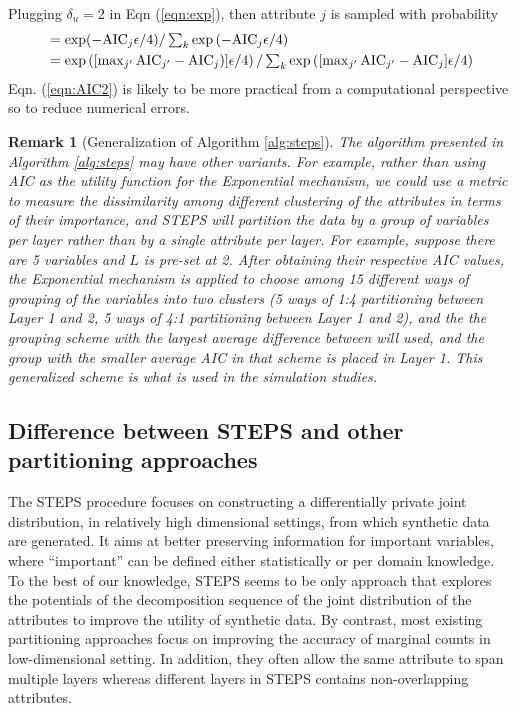 \documentclass[12pt, A4]{article}
\theoremstyle{plain}
\theoremstyle{exampstyle}\newtheorem{defn}{Definition}
\theoremstyle{exampstyle}\newtheorem{lem}{Lemma}
\theoremstyle{exampstyle}\newtheorem{cor}{Corollary}
\theoremstyle{exampstyle}\newtheorem{pro}{Proposition}
\theoremstyle{exampstyle}\newtheorem{cla}{Claim}
\theoremstyle{exampstyle}\newtheorem{rem}{Remark}
\begin{document}
Plugging $\delta_u =2 $ in Eqn (\ref{eqn:exp}), then attribute $j$ is sampled with probability
\begin{align}
&\textstyle= \exp(-\mbox{AIC}_j\epsilon/4)/\sum_k\exp\left(-\mbox{AIC}_j\epsilon/4\right)\notag\\
&\textstyle= \exp\left([\max_{j'}\mbox{AIC}_{j'}-\mbox{AIC}_j)] \epsilon/4\right)/\sum_k\exp\left([\max_{j'}\mbox{AIC}_{j'}-\mbox{AIC}_j]\epsilon/4\right)\label{eqn:AIC2}
\end{align}
Eqn.  (\ref{eqn:AIC2}) is likely to be more practical from a computational perspective so to reduce numerical errors. 

\begin{rem}[Generalization of  Algorithm \ref{alg:steps}]\label{rem:alg}
The algorithm presented in Algorithm \ref{alg:steps} may have other variants. For example, rather than using AIC as the utility function for the Exponential mechanism, we could use a metric to measure the dissimilarity among different clustering of the attributes in terms of their importance, and STEPS will partition the data by a group of variables per layer rather than by a single attribute per layer. For example, suppose there are 5 variables and $L$ is pre-set at 2. After obtaining their respective AIC values, the Exponential mechanism is applied to choose among 15 different ways of grouping of the variables into two clusters (5 ways of 1:4 partitioning between Layer 1 and 2, 5 ways of 4:1 partitioning between Layer 1 and 2), and the the grouping scheme with the largest average difference between will used, and the group with the smaller average AIC in that scheme is placed in Layer 1. This generalized scheme is what is used in the simulation studies.
\end{rem}

\subsection{Difference between STEPS and other partitioning approaches}\label{sec:UH}

The STEPS procedure focuses on constructing a differentially private joint distribution, in relatively high dimensional settings, from which synthetic data are generated. It aims at  better  preserving information for important variables, where ``important'' can be defined either statistically or per domain knowledge. To the best of our knowledge, STEPS seems to be only approach that explores the potentials of the decomposition sequence of the joint distribution of the attributes to improve the utility of synthetic data. By contrast, most existing partitioning approaches focus on improving the accuracy of marginal counts in low-dimensional setting. In addition, they often allow the same attribute to span multiple layers whereas different layers in STEPS contains non-overlapping attributes. 
\end{document}
